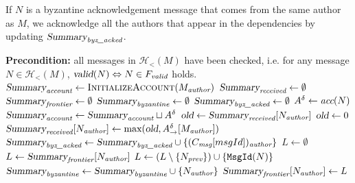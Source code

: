 If $N$ is a byzantine acknowledgement message that comes from the same author as $M$, we acknowledge all the authors that appear in the dependencies by updating $\textsl{Summary}_\emph{byz\_acked}$.
\begin{algorithm}[ht]
    \caption{Function that creates summary based on a message}
    \label{alg:create-summary}
\begin{algorithmic}[1]
    \Statex \textbf{Precondition:} all messages in $\mathcal H_<(M)$ have been checked, i.e. for any message $N \in \mathcal H_<(M)$, $\textsl{valid}(N) \Leftrightarrow N \in F_\emph{valid}$ holds.
    \State $\var{Summary}_\emph{account} \gets \Call{InitializeAccount}{M_\emph{author}}$
    \State $\textsl{Summary}_\emph{received} \gets \emptyset$ 
    \State $\textsl{Summary}_\emph{frontier} \gets \emptyset$ 
    \State $\textsl{Summary}_\emph{byzantine} \gets \emptyset$
    \State $\textsl{Summary}_\emph{byz\_acked} \gets \emptyset$
                \State $A^\delta \gets \textit{acc}(N)$
                    \State $\textsl{Summary}_\emph{account} \gets \textsl{Summary}_\emph{account} \sqcup A^\delta$
                \Else
                            \State $\textsl{old} \gets \textsl{Summary}_\emph{received}[N_\emph{author}]$
                        \Else
                            \State $\textsl{old} \gets 0$
                        \EndIf
                        \State $\textsl{Summary}_\emph{received}[N_\emph{author}] \gets \text{max}(\textsl{old}, A^\delta_\rightarrow[M_\emph{author}])$
                    \EndIf
                \EndIf
            \Else {}
                        \State $\textsl{Summary}_\emph{byz\_acked} \gets \textsl{Summary}_\emph{byz\_acked} \cup \{(C_\emph{msg}[msgId])_\emph{author}\}$
                    \EndFor
                \EndIf
            \EndIf
        \EndIf
        \State $L \gets \emptyset$ \label{alg:create-summary:frontier}
            \State $L \gets \textsl{Summary}_\emph{frontier}[N_\emph{author}]$
        \EndIf
        \State $L \gets (L \setminus \{N_\emph{prev}\}) \cup \{\texttt{MsgId}(N)\}$
            \State $\textsl{Summary}_\emph{byzantine} \gets \textsl{Summary}_\emph{byzantine} \cup \{N_\emph{author}\}$
        \EndIf
        \State $\textsl{Summary}_\emph{frontier}[N_\emph{author}] \gets L$
    \EndFor
    \State \Return {}


\end{algorithmic}
\end{algorithm}
